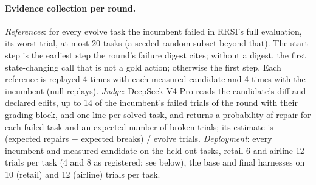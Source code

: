 \documentclass[11pt]{article}
\begin{document}
\begin{table}[t]
\centering
\small
\setlength{\tabcolsep}{3pt}
\caption{Evidence compared in Study 2, per candidate, with $b\in\{10,40,80\}$; full evaluation costs 148 (retail) or 60 (airline) episodes. The priors have means 0.41 or 0.29 (audited analyst accuracy), 0.7 and 0.2. Every rule decides with RRSI's selection rule.}
\label{tab:evidence}
\end{table}

\paragraph{Evidence collection per round.} \emph{References}: for every evolve task the incumbent failed in RRSI's full evaluation, its worst trial, at most 20 tasks (a seeded random subset beyond that). The start step is the earliest step the round's failure digest cites; without a digest, the first state-changing call that is not a gold action; otherwise the first step. Each reference is replayed 4 times with each measured candidate and 4 times with the incumbent (null replays). \emph{Judge}: DeepSeek-V4-Pro reads the candidate's diff and declared edits, up to 14 of the incumbent's failed trials of the round with their grading block, and one line per solved task, and returns a probability of repair for each failed task and an expected number of broken trials; its estimate is (expected repairs $-$ expected breaks) / evolve trials. \emph{Deployment}: every incumbent and measured candidate on the held-out tasks, retail 6 and airline 12 trials per task (4 and 8 as registered; see below), the base and final harnesses on 10 (retail) and 12 (airline) trials per task.
\end{document}

